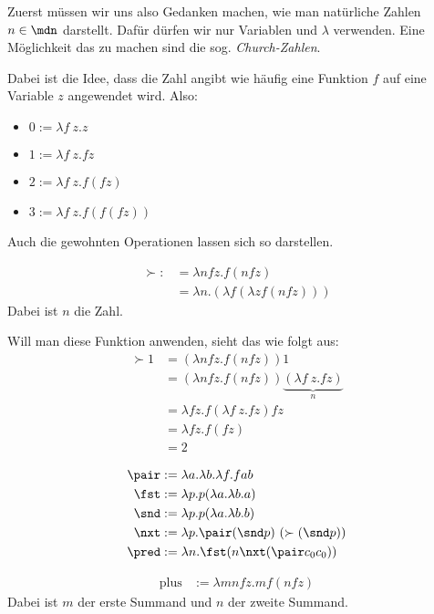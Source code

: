 Zuerst müssen wir uns also Gedanken machen, wie man natürliche Zahlen $n \in \mdn$
darstellt. Dafür dürfen wir nur Variablen und $\lambda$ verwenden. Eine Möglichkeit
das zu machen sind die sog. \textit{Church-Zahlen}.

Dabei ist die Idee, dass die Zahl angibt wie häufig eine Funktion $f$ auf eine
Variable $z$ angewendet wird. Also:
\begin{itemize}
    \item $0 := \lambda f~z. z$
    \item $1 := \lambda f~z. f z$
    \item $2 := \lambda f~z. f (f z)$
    \item $3 := \lambda f~z. f (f (f z))$
\end{itemize}

Auch die gewohnten Operationen lassen sich so darstellen.

\begin{beispiel}
    \begin{align*}
        \succ :&= \lambda n f z. f (n f z)\\
               &= \lambda n. (\lambda f  (\lambda z f (n f z)))
    \end{align*}
    Dabei ist $n$ die Zahl. 

    Will man diese Funktion anwenden, sieht das wie folgt aus:
    \begin{align*}
    \succ 1&= (\lambda n f z. f(n f z)) 1\\
           &= (\lambda n f z. f(n f z)) \underbrace{(\lambda f~z. f z)}_{n}\\
           &= \lambda f z. f (\lambda f~z. f z) f z\\
           &= \lambda f z. f (f z)\\
           &= 2
    \end{align*}
\end{beispiel}

\begin{beispiel}
    \begin{align*}
        \pair&:= \lambda a. \lambda b. \lambda f. f a b\\
        \fst &:= \lambda p. p (\lambda a. \lambda b. a)\\
        \snd &:= \lambda p. p (\lambda a. \lambda b. b)\\
        \nxt &:= \lambda p. \pair (\snd p)~(\succ (\snd p))\\
        \pred&:= \lambda n. \fst (n \nxt (\pair c_0 c_0))
    \end{align*}
\end{beispiel}
\begin{beispiel}[Addition]
    \begin{align*}
        \text{plus} &:= \lambda m n f z. m f (n f z)
    \end{align*}
    Dabei ist $m$ der erste Summand und $n$ der zweite Summand.
\end{beispiel}

